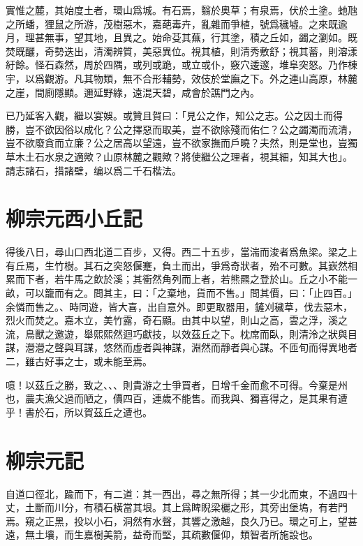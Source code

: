 實惟之麓，其始度土者，環山爲城。有石焉，翳於奧草；有泉焉，伏於土塗。{虵}虺之所蟠，{狸}鼠之所游，茂樹惡木，嘉葩毒卉，亂雜而爭植，號爲穢墟。之來既逾月，理甚無事，望其地，且異之。始命芟其蕪，行其塗，積之丘如，蠲之瀏如。既焚既釃，奇勢迭出，清濁辨質，美惡異位。視其植，則清秀敷舒；視其蓄，則溶漾紆餘。怪石森然，周於四隅，或列或跪，或立或仆，竅穴逶邃，堆阜突怒。乃作棟宇，以爲觀游。凡其物類，無不合形輔勢，效伎於堂廡之下。外之連山高原，林麓之崖，間廁隱顯。邇延野綠，遠混天碧，咸會於譙門之內。

已乃延客入觀，繼以宴娛。或贊且賀曰：「見公之作，知公之志。公之因土而得勝，豈不欲因俗以成化？公之擇惡而取美，豈不欲除殘而佑仁？公之蠲濁而流清，豈不欲廢貪而立廉？公之居高以望遠，豈不欲家撫而戶曉？夫然，則是堂也，豈獨草木土石水泉之適歟？山原林麓之觀歟？將使繼公之理者，視其細，知其大也」。請志諸石，措諸壁，编以爲二千石楷法。

\theendnotes

\section[鈷鉧潭西小丘記\quad{\small 柳宗元}]{{\normalsize 柳宗元}\quad {}西小丘記}
得後八日，尋山口西北道二百步，又得。西二十五步，當湍而浚者爲魚梁。梁之上有丘焉，生竹樹。其石之突怒偃蹇，負土而出，爭爲奇狀者，殆不可數。其嶔然相累而下者，若牛馬之飲於溪；其衝然角列而上者，若熊羆之登於山。丘之小不能一畝，可以籠而有之。問其主，曰：「之棄地，貨而不售。」問其價，曰：「止四百。」余憐而售之。、時同遊，皆大喜，出自意外。即更取器用，鏟刈穢草，伐去惡木，烈火而焚之。嘉木立，美竹露，奇石顯。由其中以望，則山之高，雲之浮，溪之流，鳥獸之邀遊，舉熙熙然迴巧獻技，以效茲丘之下。枕席而臥，則清泠之狀與目謀，瀯瀯之聲與耳謀，悠然而虛者與神謀，淵然而靜者與心謀。不匝旬而得異地者二，雖古好事之士，或未能至焉。

噫！以茲丘之勝，致之、、、則貴游之士爭買者，日增千金而愈不可得。今棄是州也，農夫漁父過而陋之，價四百，連歲不能售。而我與、獨喜得之，是其果有遭乎！書於石，所以賀茲丘之遭也。

\section[小石城山記\quad{\small 柳宗元}]{{\normalsize 柳宗元}\quad {}記}
自道口徑北，踰而下，有二道：其一西出，尋之無所得；其一少北而東，不過四十丈，土斷而川分，有積石橫當其垠。其上爲睥睨梁欐之形，其旁出堡塢，有若門焉。窺之正黑，投以小石，洞然有水聲，其響之激越，良久乃已。環之可上，望甚遠，無土壤，而生嘉樹美箭，益奇而堅，其疏數偃仰，類智者所施設也。

